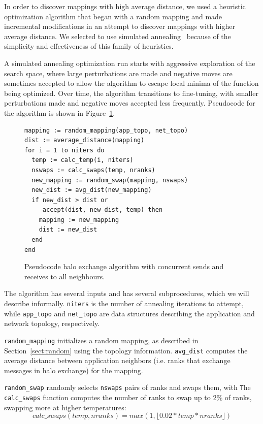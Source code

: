 \documentclass{acm_proc_article-sp}
\begin{document}
In order to discover mappings with high average distance, we used
a heuristic optimization algorithm that began with a random mapping
and made incremental modifications in an attempt to discover mappings
with higher average distance.
We selected to use simulated annealing~\cite{Press2007} because of the
simplicity and effectiveness of this family of heuristics.

A simulated annealing optimization run starts with aggressive exploration
of the search space, where large perturbations are made and negative
moves are sometimes accepted to allow the algorithm to escape local
minima of the function being optimized.  Over time, the algorithm
transitions to fine-tuning, with smaller perturbations made and negative moves
accepted less frequently.  Pseudocode for the algorithm is shown in
Figure~\ref{fig:anneal_pseudocode}.

\begin{figure}
  {\footnotesize
  \begin{lstlisting}[frame=lines, basicstyle=\ttfamily,columns=fixed]
mapping := random_mapping(app_topo, net_topo)
dist := average_distance(mapping)
for i = 1 to niters do
  temp := calc_temp(i, niters)
  nswaps := calc_swaps(temp, nranks)
  new_mapping := random_swap(mapping, nswaps)
  new_dist := avg_dist(new_mapping)
  if new_dist > dist or
     accept(dist, new_dist, temp) then
    mapping := new_mapping
    dist := new_dist
  end
end
  \end{lstlisting}
  }
  \caption{Pseudocode halo exchange algorithm with concurrent sends and
           receives to all neighbours.}
    \label{fig:anneal_pseudocode}
\end{figure}

The algorithm has several inputs and has several subprocedures,
which we will describe informally.
\texttt{niters} is the number of annealing iterations to attempt, while
\texttt{app\_topo} and \texttt{net\_topo} are data structures
describing the application and network topology, respectively.

\texttt{random\_mapping} initializes a random mapping, as described
in Section~\ref{sect:random} using the topology information.
\texttt{avg\_dist} computes the average distance between
application neighbors (i.e. ranks that exchange messages in
halo exchange) for the mapping.

\texttt{random\_swap} randomly selects \texttt{nswaps} pairs of ranks
and swaps them, with \texttt  The \texttt{calc\_swaps} function computes
the number of ranks to swap up to 2\% of ranks, swapping more at higher
temperatures:
$$calc\_swaps(temp, nranks) = max(1, \lfloor 0.02 * temp * nranks \rfloor)$$
\end{document}
